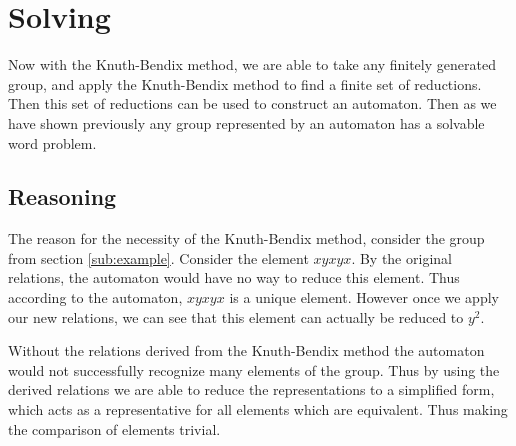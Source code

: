 \documentclass[10pt]{amsart}
\theoremstyle{definition}
\theoremstyle{remark}
\begin{document}
\section{Solving}%
\label{sec:solving}

Now with the Knuth-Bendix method, we are able to take any finitely generated
group, and apply the Knuth-Bendix method to find a finite set of reductions.
Then this set of reductions can be used to construct an automaton. Then as we
have shown previously any group represented by an automaton has a solvable word
problem.

\subsection{Reasoning}%
\label{sub:reasoning}

The reason for the necessity of the Knuth-Bendix method, consider the group
from section \ref{sub:example}. Consider the element $xyxyx$. By the original
relations, the automaton would have no way to reduce this element. Thus
according to the automaton, $xyxyx$ is a unique element. However once we apply
our new relations, we can see that this element can actually be reduced to
$y^2$.

Without the relations derived from the Knuth-Bendix method the automaton would
not successfully recognize many elements of the group. Thus by using the
derived relations we are able to reduce the representations to a simplified
form, which acts as a representative for all elements which are equivalent.
Thus making the comparison of elements trivial.

\nocite{*}


\end{document}
